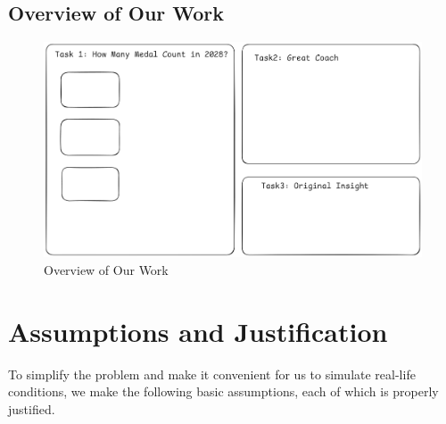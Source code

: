 \documentclass{mcmthesis}
\begin{document}
	
	
	
	
	
	
	
	
	\subsection{Overview of Our Work}
		\begin{figure}[H]
		\centering
		\includegraphics[width=1\linewidth]{fig/1.png}
		\caption{Overview of Our Work}
		\label{fig:Overview of Our Work}
	\end{figure}
	
	
	
	
	
	
	
	
	\section{Assumptions and Justification}
	
	To simplify the problem and make it convenient for us to simulate real-life 
	conditions, we make the following basic assumptions, each of which is properly 
	justified.
	
\end{document}
